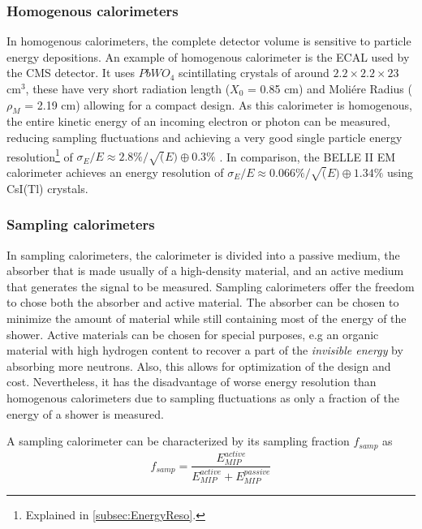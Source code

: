 \subsubsection*{Homogenous calorimeters}

In homogenous calorimeters, the complete detector volume is sensitive to particle energy depositions. An example of homogenous calorimeter is the ECAL used by the CMS detector. It uses $PbWO_4$ scintillating crystals of around $2.2 \times 2.2 \times 23$ cm$^3$, these have very short radiation length ($X_0$ = 0.85 cm) and Moli\'ere Radius ($\rho_M$ = 2.19 cm) allowing for a compact design. As this calorimeter is homogenous, the entire kinetic energy of an incoming electron or photon can be measured, reducing sampling fluctuations and achieving a very good single particle energy resolution\footnote{Explained in \ref{subsec:EnergyReso}.} of $\sigma_E/E \approx 2.8\%/\sqrt(E) \oplus 0.3\%$ \cite{1742-6596-587-1-012001}. In comparison, the BELLE II EM calorimeter achieves an energy resolution of $\sigma_E/E \approx 0.066\%/\sqrt(E) \oplus 1.34\%$ \cite{Abe:2010gxa} using CsI(Tl) crystals.

\subsubsection*{Sampling calorimeters}

In sampling calorimeters, the calorimeter is divided into a passive medium, the absorber that is made usually of a high-density material, and an active medium that generates the signal to be measured. Sampling calorimeters offer the freedom to chose both the absorber and active material. The absorber can be chosen to minimize the amount of material while still containing most of the energy of the shower. Active materials can be chosen for special purposes, e.g an organic material with high hydrogen content to recover a part of the \textit{invisible energy} by absorbing more neutrons. Also, this allows for optimization of the design and cost. Nevertheless, it has the disadvantage of worse energy resolution than homogenous calorimeters due to sampling fluctuations as only a fraction of the energy of a shower is measured.

A sampling calorimeter can be characterized by its sampling fraction $f_{samp}$ as
\begin{equation}
  f_{samp} = \frac{E_{MIP}^{active}}{E_{MIP}^{active} + E_{MIP}^{passive}}
\end{equation}

